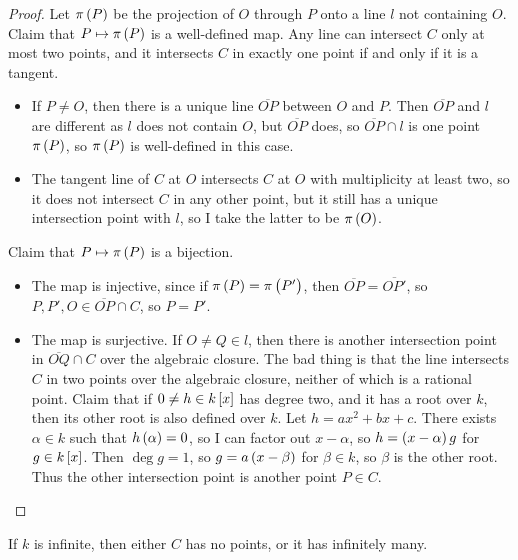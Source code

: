 \begin{proof}
Let $ \pi\br{P} $ be the projection of $ O $ through $ P $ onto a line $ l $ not containing $ O $. Claim that $ P \mapsto \pi\br{P} $ is a well-defined map. Any line can intersect $ C $ only at most two points, and it intersects $ C $ in exactly one point if and only if it is a tangent.
\begin{itemize}
\item If $ P \ne O $, then there is a unique line $ \overline{OP} $ between $ O $ and $ P $. Then $ \overline{OP} $ and $ l $ are different as $ l $ does not contain $ O $, but $ \overline{OP} $ does, so $ \overline{OP} \cap l $ is one point $ \pi\br{P} $, so $ \pi\br{P} $ is well-defined in this case.
\item The tangent line of $ C $ at $ O $ intersects $ C $ at $ O $ with multiplicity at least two, so it does not intersect $ C $ in any other point, but it still has a unique intersection point with $ l $, so I take the latter to be $ \pi\br{O} $.
\end{itemize}
Claim that $ P \mapsto \pi\br{P} $ is a bijection.
\begin{itemize}
\item The map is injective, since if $ \pi\br{P} = \pi\br{P'} $, then $ \overline{OP} = \overline{OP'} $, so $ P, P', O \in \overline{OP} \cap C $, so $ P = P' $.
\item The map is surjective. If $ O \ne Q \in l $, then there is another intersection point in $ \overline{OQ} \cap C $ over the algebraic closure. The bad thing is that the line intersects $ C $ in two points over the algebraic closure, neither of which is a rational point. Claim that if $ 0 \ne h \in k\sbr{x} $ has degree two, and it has a root over $ k $, then its other root is also defined over $ k $. Let $ h = ax^2 + bx + c $. There exists $ \alpha \in k $ such that $ h\br{\alpha} = 0 $, so I can factor out $ x - \alpha $, so $ h = \br{x - \alpha}g $ for $ g \in k\sbr{x} $. Then $ \deg g = 1 $, so $ g = a\br{x - \beta} $ for $ \beta \in k $, so $ \beta $ is the other root. Thus the other intersection point is another point $ P \in C $.
\end{itemize}
\end{proof}

\begin{corollary}
If $ k $ is infinite, then either $ C $ has no points, or it has infinitely many.
\end{corollary}

\pagebreak

